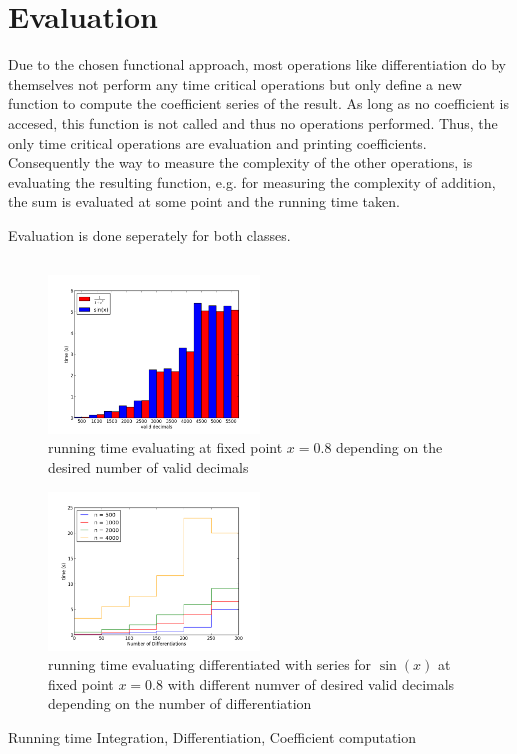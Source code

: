 	\section{Evaluation}
		Due to the chosen functional approach, most operations like differentiation do by themselves not perform any time critical operations but only define a new function to compute the coefficient series of the result.
		As long as no coefficient is accesed, this function is not called and thus no operations performed.
		Thus, the only time critical operations are evaluation and printing coefficients.
		Consequently the way to measure the complexity of the other operations, is evaluating the resulting function, 
		e.g. for measuring the complexity of addition, the sum is evaluated at some point and the running time taken.


		Evaluation is done seperately for both classes.
		\subsection{\baana}

			\begin{figure}[h]
				\centering
				\includegraphics[width=0.5\textwidth]{img/analytic/ba_ana_dep_on_n_bar.png}
				\caption{running time evaluating \baana at fixed point $x=0.8$ depending on the desired number of valid decimals}
				\label{fig:ba_ana dep on n}
			\end{figure}
			\begin{figure}[h]
				\centering
				\includegraphics[width=0.5\textwidth]{img/analytic/ba_ana_dep_on_diff_sin.png}
				\caption{running time evaluating differentiated \baana with series for $\sin(x)$ at fixed point $x=0.8$ with different numver of desired valid decimals depending on the number of differentiation}
				\label{fig:ba_ana dep on differentiation}
			\end{figure}
			Running time Integration, Differentiation, Coefficient computation 
